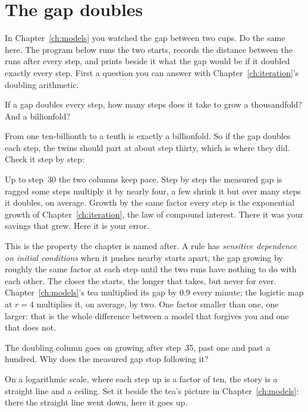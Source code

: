 \section{The gap doubles}
\label{sec:ch06-gap}

\noindent
In Chapter~\ref{ch:models} you watched the gap between two cups. Do the same
here. The program below runs the two starts, records the distance between
the runs after every step, and prints beside it what the gap would be if it
doubled exactly every step. First a question you can answer with
Chapter~\ref{ch:iteration}'s doubling arithmetic.

\begin{think}
If a gap doubles every step, how many steps does it take to grow a
thousandfold? And a billionfold?
\end{think}
From one ten-billionth to a tenth is exactly a billionfold. So if the gap
doubles each step, the twins should part at about step thirty, which is
where they did. Check it step by step:



\noindent
Up to step~30 the two columns keep pace. Step by step the measured gap is
ragged \dash{} some steps multiply it by nearly four, a few shrink it \dash{}
but over many steps it doubles, on average. Growth by the same factor every
step is the exponential growth of Chapter~\ref{ch:iteration}, the law of
compound interest. There it was your savings that grew. Here it is your
error.

This is the property the chapter is named after. A rule has
\emph{sensitive dependence on initial conditions} when it pushes nearby
starts apart, the gap growing by roughly the same factor at each step until
the two runs have nothing to do with each other. The closer the starts, the
longer that takes, but never for ever. Chapter~\ref{ch:models}'s tea
multiplied its gap by \num{0.9} every minute; the logistic map at $r = 4$
multiplies it, on average, by two. One factor smaller than one, one larger:
that is the whole difference between a model that forgives you and one that
does not.

\begin{think}
The doubling column goes on growing after step~35, past one and past a
hundred. Why does the measured gap stop following it?
\end{think}
On a logarithmic scale, where each step up is a factor of ten, the story is
a straight line and a ceiling. Set it beside the tea's picture in
Chapter~\ref{ch:models}: there the straight line went down, here it goes up.

